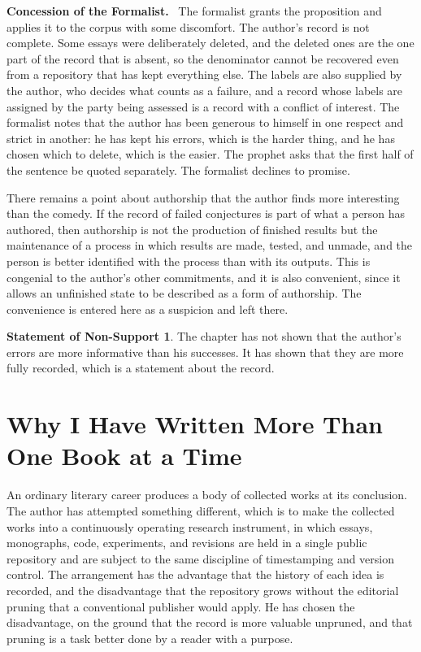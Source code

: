 \documentclass[11pt,openany,twoside]{book}
\theoremstyle{plain}
\theoremstyle{definition}
\newtheorem{nonsupport}{Statement of Non-Support}
\theoremstyle{remark}
\newenvironment{concession}{\par\medskip\noindent\textbf{Concession of the Formalist.}\ }{\par\medskip}
\begin{document}
\begin{concession}
The formalist grants the proposition and applies it to the corpus with some discomfort. The author's record is not complete. Some essays were deliberately deleted, and the deleted ones are the one part of the record that is absent, so the denominator cannot be recovered even from a repository that has kept everything else. The labels are also supplied by the author, who decides what counts as a failure, and a record whose labels are assigned by the party being assessed is a record with a conflict of interest. The formalist notes that the author has been generous to himself in one respect and strict in another: he has kept his errors, which is the harder thing, and he has chosen which to delete, which is the easier. The prophet asks that the first half of the sentence be quoted separately. The formalist declines to promise.
\end{concession}

There remains a point about authorship that the author finds more interesting than the comedy. If the record of failed conjectures is part of what a person has authored, then authorship is not the production of finished results but the maintenance of a process in which results are made, tested, and unmade, and the person is better identified with the process than with its outputs. This is congenial to the author's other commitments, and it is also convenient, since it allows an unfinished state to be described as a form of authorship. The convenience is entered here as a suspicion and left there.

\begin{nonsupport}
The chapter has not shown that the author's errors are more informative than his successes. It has shown that they are more fully recorded, which is a statement about the record.
\end{nonsupport}

\chapter{Why I Have Written More Than One Book at a Time}

An ordinary literary career produces a body of collected works at its conclusion. The author has attempted something different, which is to make the collected works into a continuously operating research instrument, in which essays, monographs, code, experiments, and revisions are held in a single public repository and are subject to the same discipline of timestamping and version control. The arrangement has the advantage that the history of each idea is recorded, and the disadvantage that the repository grows without the editorial pruning that a conventional publisher would apply. He has chosen the disadvantage, on the ground that the record is more valuable unpruned, and that pruning is a task better done by a reader with a purpose.
\end{document}
